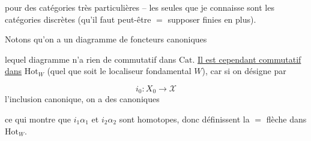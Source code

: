 pour des catégories très particulières -- les seules que je connaisse sont les catégories discrètes (qu'il faut peut-être $=$ supposer finies en plus).

Notons qu'on a un diagramme de foncteurs canoniques

lequel diagramme n'a rien de commutatif dans $\mathrm{Cat}$. \uline{Il est cependant commutatif dans} $\mathrm{Hot}_W$ (quel que soit le localiseur fondamental $W$),  car si on désigne par

\[
i_0:X_0\longrightarrow\mathscr{X}
\]
l'inclusion canonique, on a des  canoniques

ce qui montre que $i_1\alpha_1$ et $i_2\alpha_2$ sont homotopes, donc définissent la $=$ flèche dans $\mathrm{Hot}_W$.
